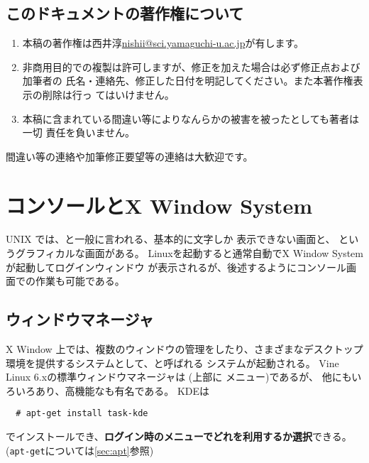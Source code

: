 \documentclass{jreport}
\begin{document}
\section*{このドキュメントの著作権について}

\begin{enumerate}
\item 本稿の著作権は西井淳\url{nishii@sci.yamaguchi-u.ac.jp}が有します。
\item 非商用目的での複製は許可しますが、修正を加えた場合は必ず修正点および加筆者の
氏名・連絡先、修正した日付を明記してください。また本著作権表示の削除は行っ
てはいけません。
\item 本稿に含まれている間違い等によりなんらかの被害を被ったとしても著者は一切
責任を負いません。
\end{enumerate}
間違い等の連絡や加筆修正要望等の連絡は大歓迎です。

\chapter{コンソールとX Window System}

UNIX では、と一般に言われる、基本的に文字しか
表示できない画面と、 というグラフィカルな画面がある。
Linuxを起動すると通常自動でX Window Systemが起動してログインウィンドウ
が表示されるが、後述するようにコンソール画面での作業も可能である。


\section{ウィンドウマネージャ}

X Window 上では、複数のウィンドウの管理をしたり、さまざまなデスクトップ
環境を提供するシステムとして、と呼ばれる
システムが起動される。 
Vine Linux 6.xの標準ウィンドウマネージャは  (上部に
メニュー)であるが、
他にもいろいろあり、高機能なも有名である。
KDEは
\begin{verbatim}
  # apt-get install task-kde
\end{verbatim}
でインストールでき、\textbf{ログイン時のメニューでどれを利用するか選択}できる。
(\verb|apt-get|については\ref{sec:apt}参照)
\end{document}
